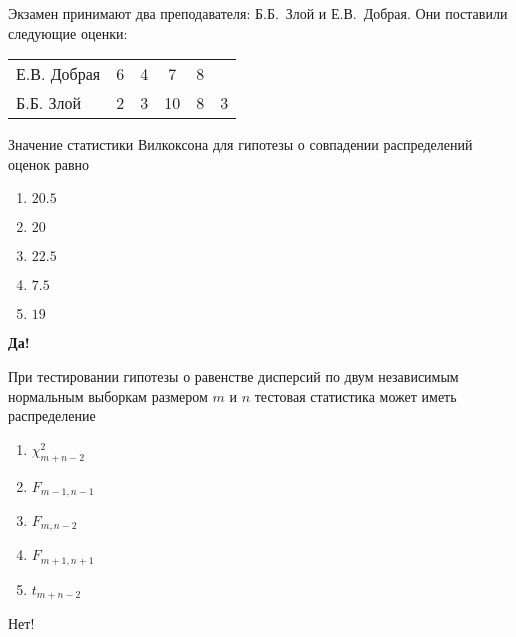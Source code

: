 \documentclass[t]{beamer}
\begin{document}
 \begin{frame} \label{48-Yes} 
\begin{block}{48} 

Экзамен принимают два преподавателя: Б.Б.~Злой и Е.В.~Добрая. Они поставили следующие оценки:

\vspace{5mm}
\begin{tabular}{lccccc}
  \toprule
   Е.В. Добрая & 6 & 4 & 7  & 8 &   \\
   Б.Б. Злой   & 2 & 3 & 10 & 8 & 3 \\
  \bottomrule
\end{tabular}
\vspace{5mm}


Значение статистики Вилкоксона для гипотезы о совпадении распределений оценок равно


 \end{block} 
\begin{enumerate} 
\item[] \hyperlink{48-No}{\beamergotobutton{} $20.5$}
\item[] \hyperlink{48-No}{\beamergotobutton{} $20$}
\item[] \hyperlink{48-Yes}{\beamergotobutton{} $22.5$}
\item[] \hyperlink{48-No}{\beamergotobutton{} $7.5$}
\item[] \hyperlink{48-No}{\beamergotobutton{} $19$}
\end{enumerate} 

 \textbf{Да!} 
 \hyperlink{49}{}\end{frame} 


 \begin{frame} \label{1-No} 
\begin{block}{1} 

  При тестировании гипотезы о равенстве дисперсий по двум независимым нормальным выборкам размером $m$ и $n$ тестовая статистика может иметь распределение


 \end{block} 
\begin{enumerate} 
\item[] \hyperlink{1-No}{\beamergotobutton{} $\chi^2_{m+n-2}$}
\item[] \hyperlink{1-Yes}{\beamergotobutton{} $F_{m-1,n-1}$}
\item[] \hyperlink{1-No}{\beamergotobutton{} $F_{m,n - 2}$}
\item[] \hyperlink{1-No}{\beamergotobutton{} $F_{m+1,n+1}$}
\item[] \hyperlink{1-No}{\beamergotobutton{} $t_{m+n-2}$}
\end{enumerate} 

 \alert{Нет!} 
\end{frame} 
\end{document}
